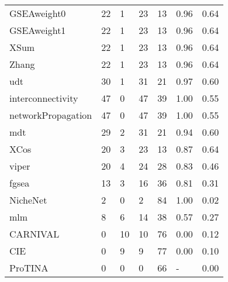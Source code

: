 \begin{newpdflayout}{210mm}{297mm}
\begin{table}[]
\begin{tabular}{lllllll}
GSEAweight0 & 22 & 1 & 23 & 13 & 0.96 & 0.64 \\
GSEAweight1 & 22 & 1 & 23 & 13 & 0.96 & 0.64 \\
XSum & 22 & 1 & 23 & 13 & 0.96 & 0.64 \\
Zhang & 22 & 1 & 23 & 13 & 0.96 & 0.64 \\
udt & 30 & 1 & 31 & 21 & 0.97 & 0.60 \\
interconnectivity & 47 & 0 & 47 & 39 & 1.00 & 0.55 \\
networkPropagation & 47 & 0 & 47 & 39 & 1.00 & 0.55 \\
mdt & 29 & 2 & 31 & 21 & 0.94 & 0.60 \\
XCos & 20 & 3 & 23 & 13 & 0.87 & 0.64 \\
viper & 20 & 4 & 24 & 28 & 0.83 & 0.46 \\
fgsea & 13 & 3 & 16 & 36 & 0.81 & 0.31 \\
NicheNet & 2 & 0 & 2 & 84 & 1.00 & 0.02 \\
mlm & 8 & 6 & 14 & 38 & 0.57 & 0.27 \\
CARNIVAL & 0 & 10 & 10 & 76 & 0.00 & 0.12 \\
CIE & 0 & 9 & 9 & 77 & 0.00 & 0.10 \\
ProTINA & 0 & 0 & 0 & 66 & - & 0.00 \\ \hline
\end{tabular}
\end{table}


\end{newpdflayout}
